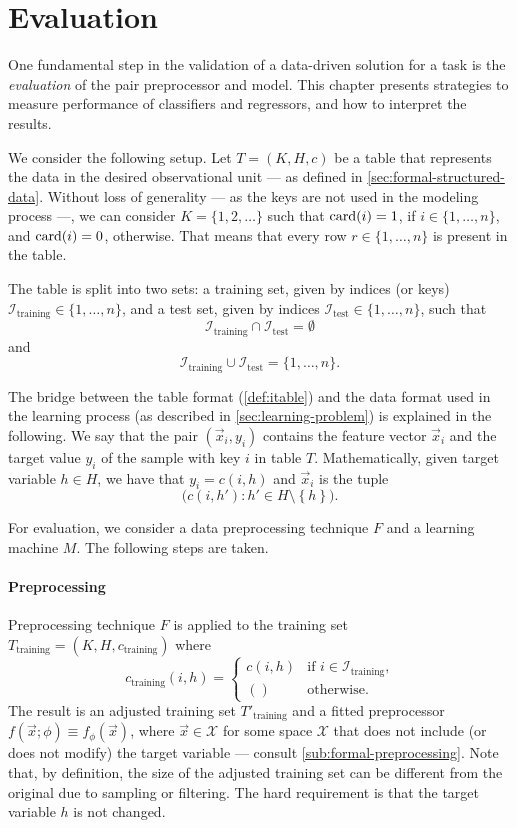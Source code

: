 \section{Evaluation}
\label{sec:evaluation}

One fundamental step in the validation of a data-driven solution for a task is the
\emph{evaluation} of the pair preprocessor and model. This chapter presents strategies to
measure performance of
classifiers and regressors, and how to interpret the results.

We consider the following setup.  Let $T = (K, H, c)$ be a table that represents the data
in the desired observational unit --- as defined in \cref{sec:formal-structured-data}.
Without loss of generality --- as the keys are not used in the modeling process ---, we
can consider $K = \{1, 2, \dots\}$ such that $\rowcard[i] = 1$, if $i \in \{1, \dots,
n\}$, and $\rowcard[i] = 0$, otherwise.  That means that every row $r \in \{1, \dots, n\}$
is present in the table.

The table is split into two sets: a training set, given by indices (or keys)
$\mathcal{I}_\text{training} \in \{1, \dots, n\}$, and a test set, given by indices
$\mathcal{I}_\text{test} \in \{1, \dots, n\}$, such that $$\mathcal{I}_\text{training}
\cap \mathcal{I}_\text{test} = \emptyset$$ and $$\mathcal{I}_\text{training} \cup
\mathcal{I}_\text{test} = \{1,\dots,n\}\text{.}$$

The bridge between the table format (\cref{def:itable}) and the data format used in the
learning process (as described in \cref{sec:learning-problem}) is explained in the
following.  We say that the pair $(\vec{x}_i, y_i)$ contains the feature vector $\vec{x}_i$
and the target value $y_i$ of the sample with key $i$ in table $T$.  Mathematically,
given target variable $h \in H$, we have that $y_i = c(i, h)$ and $\vec{x}_i$ is the tuple
$$\big(c(i, h') : h' \in H \setminus \left\{ h \right\}\big)\text{.}$$

For evaluation, we consider a data preprocessing technique $F$ and a learning machine
$M$.  The following steps are taken.

\paragraph{Preprocessing}

Preprocessing technique $F$ is applied to the training set $T_\text{training} = (K, H,
c_\text{training})$ where \[
  c_\text{training}(i, h) = \begin{cases}
    c(i, h) & \text{if } i \in \mathcal{I}_\text{training}\text{,} \\
    () & \text{otherwise}\text{.}
  \end{cases}
\]  The result is an adjusted training set $T'_\text{training}$ and a fitted
preprocessor $f(\vec{x}; \phi) \equiv f_\phi(\vec{x})$, where $\vec{x} \in \mathcal{X}$
for some space $\mathcal{X}$ that does not include (or does not modify) the target
variable --- consult \cref{sub:formal-preprocessing}.  Note that, by definition, the size
of the adjusted training set can be different from the original due to sampling or
filtering.  The hard requirement is that the target variable $h$ is not changed.

